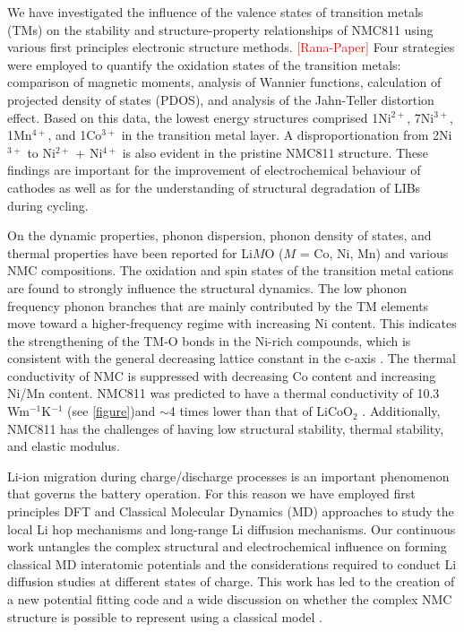 \documentclass[aps,prb,twocolumn,superscriptaddress,reprint]{revtex4-1}
\newcommand{\re}[1]{\textcolor{red}{#1}}
\begin{document}
We have investigated the influence of the valence states of transition metals (TMs) on the stability and structure-property relationships of NMC811 using various first principles electronic structure methods. \re{[Rana-Paper]\cite{rana}} Four strategies were employed to quantify the oxidation states of the transition metals: comparison of magnetic moments, analysis of Wannier functions, calculation of projected density of states (PDOS), and analysis of the Jahn-Teller distortion effect.\cite{yang2019highly,yang2020chemical} Based on this data, the lowest energy structures comprised 1Ni$^{2+}$, 7Ni$^{3+}$, 1Mn$^{4+}$, and 1Co$^{3+}$ in the transition metal layer. A disproportionation from 2Ni$^{3+}$ to Ni$^{2+}$ + Ni$^{4+}$ is also evident in the pristine NMC811 structure. These findings are important for the improvement of electrochemical behaviour of cathodes as well as for the understanding of structural degradation of LIBs during cycling.

On the dynamic properties, phonon dispersion, phonon density of states, and thermal properties have been reported for Li$M$O ($M$ = Co, Ni, Mn) and various NMC compositions. The oxidation and spin states of the transition metal cations are found to strongly influence the structural dynamics.  The low phonon frequency phonon branches that are mainly contributed by the TM elements move toward a higher-frequency regime with increasing Ni content. This indicates the strengthening of the TM-O bonds in the Ni-rich compounds, which is consistent with the general decreasing lattice constant in the c-axis \cite{sun_electronic_2017}. The thermal conductivity of NMC is suppressed with decreasing Co content and increasing Ni/Mn content. NMC811 was predicted to have a thermal conductivity of 10.3 Wm$^{-1}$K$^{-1}$ (see \ref{figure})and $\sim$4 times lower than that of LiCoO$_{2}$ \cite{yang2019highly,yang2020chemical}. Additionally, NMC811 has the challenges of having low structural stability, thermal stability, and elastic modulus.

Li-ion migration during charge/discharge processes is an important phenomenon that governs the battery operation. For this reason we have employed first principles DFT and Classical Molecular Dynamics (MD) approaches to study the local Li hop mechanisms and long-range Li diffusion mechanisms. Our continuous work untangles the complex structural and electrochemical influence on forming classical MD interatomic potentials and the considerations required to conduct Li diffusion studies at different states of charge. This work has led to the creation of a new potential fitting code and a wide discussion on whether the complex NMC structure is possible to represent using a classical model \cite{Morgan2020}.
\end{document}
